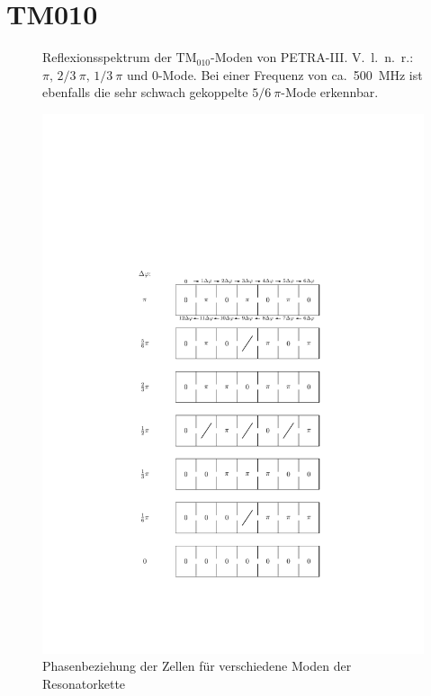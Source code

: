 \section{TM010}
\label{app:tm010_moden}
\FloatBarrier

\begin{figure}[htbp]
	\centering
	
	\caption[Reflexionsspektrum der $\mathrm{TM}_{010}$-Moden von PETRA-III]{Reflexionsspektrum der $\mathrm{TM}_{010}$-Moden von PETRA-III. V.\ l.\ n.\ r.: $\pi,\, 2/3~\pi, \, 1/3~\pi$ und $0$-Mode. Bei einer Frequenz von ca.\ \SI{500}{MHz} ist ebenfalls die sehr schwach gekoppelte $5/6~\pi$-Mode erkennbar.}
	\label{fig:spektrum_tm010}
\end{figure}

\begin{figure}[p]
	\centering
	\includegraphics[scale=1.0]{./figs/zellen_phasenbeziehung.pdf}
	\caption[Phasenbeziehung]{Phasenbeziehung der Zellen für verschiedene Moden der Resonatorkette}
	\label{fig:phasenbeziehung}
\end{figure}

